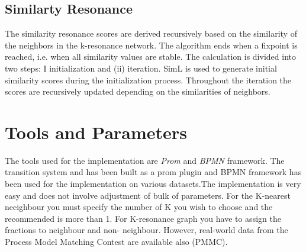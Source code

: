 \documentclass[runningheads]{llncs}
\begin{document}
\subsection{Similarty Resonance}
The similarity resonance scores are derived recursively based on the similarity of the neighbors in the k-resonance network. The algorithm ends when a fixpoint is reached, i.e. when all similarity values are stable. The calculation is divided into two steps: I initialization and (ii) iteration. SimL is used to generate initial similarity scores during the initialization process. Throughout the iteration the scores are recursively updated depending on the similarities of neighbors.

\section{Tools and Parameters}
The tools used for the implementation are \textit{Prom} and \textit{BPMN} framework. The transition system and has been built as a prom plugin and BPMN framework has been used for the implementation on various datasets.The implementation is very easy and does not involve adjustment of bulk of parameters. For the K-nearest neeighbour you must specify the number of K you wish to choose and the recommended is more than 1. For K-resonance graph you have to assign the fractions to neighbour and non- neighbour. However, real-world data from the Process Model Matching Contest are available also (PMMC).
\end{document}
